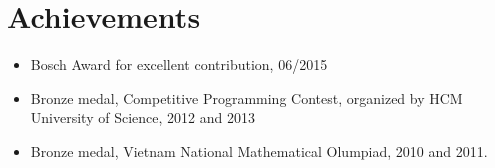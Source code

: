 \section*{Achievements}
\begin{itemize}
  \item Bosch Award for excellent contribution, 06/2015
  \item Bronze medal, Competitive Programming Contest, organized by HCM University of Science, 2012 and 2013
  \item Bronze medal, Vietnam National Mathematical Olumpiad, 2010 and 2011. 
\end{itemize}